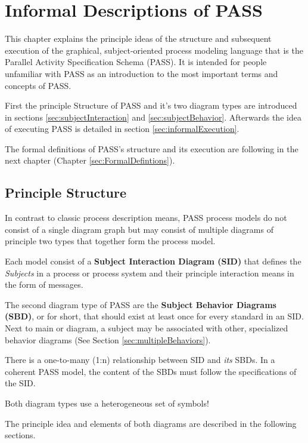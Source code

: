 \chapter{Informal Descriptions of PASS}
\label{sec:PASSStruct}

This chapter explains the principle ideas of the structure  and subsequent execution of the graphical, subject-oriented process modeling language that is the Parallel Activity Specification Schema (PASS). It is intended for people unfamiliar with PASS as an introduction to the most important terms and concepts of PASS.

First the principle Structure of PASS and it's two diagram types are introduced in sections \ref{sec:subjectInteraction} and \ref{sec:subjectBehavior}. Afterwards the idea of executing PASS is detailed in section \ref{sec:informalExecution}.

The formal definitions of PASS's structure and its execution are following in the next chapter (Chapter \ref{sec:FormalDefintions}).

\section{Principle Structure}

In contrast to classic process description means, PASS process models do not consist of a single diagram graph but may consist of multiple diagrams of principle two types that together form the process model.

Each model consist of a \textbf{Subject Interaction Diagram (SID)} that defines the \textit{Subjects} in a process or process system and their principle interaction means in the form of messages.

The second diagram type of PASS are the \textbf{Subject Behavior Diagrams (SBD)}, or  for short, that should exist at least once for every standard  in an SID. Next to main or  diagram, a subject may be associated with other, specialized behavior diagrams (See Section \ref{sec:multipleBehaviors}).

There is a one-to-many (1:n) relationship between SID and \textit{its} SBDs. In a coherent PASS model, the content of the SBDs must follow the specifications of the SID.

Both diagram types use a heterogeneous set of symbols!

The principle idea and elements of both diagrams are described in the following sections.






